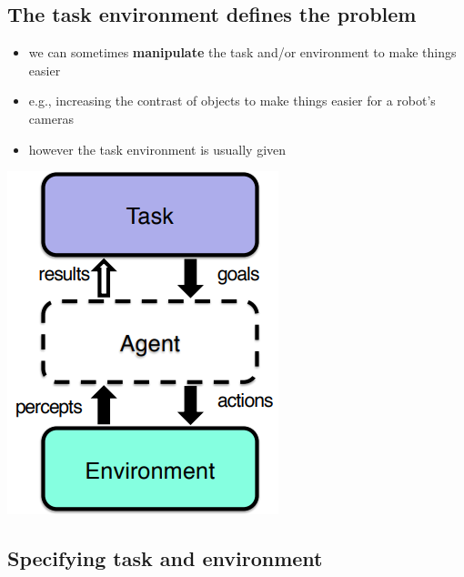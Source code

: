 \documentclass{article}
\begin{document}
\subsection{The task environment defines the problem}

\begin{multicols}{2}
\begin{itemize}
  \item we can sometimes \textbf{manipulate} the task and/or environment to make things easier 
  \item e.g., increasing the contrast of objects to make things easier for a robot’s cameras 
  \item however the task environment is usually given
\end{itemize}

\includegraphics[scale=0.5]{task_environment.png}

\end{multicols}

\subsection{Specifying task and environment}
\end{document}
